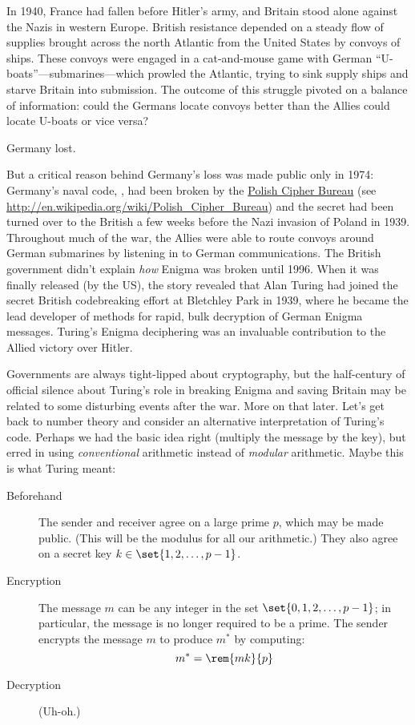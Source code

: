 In 1940, France had fallen before Hitler's army, and Britain stood alone
against the Nazis in western Europe.  British resistance depended on a
steady flow of supplies brought across the north Atlantic from the United
States by convoys of ships.  These convoys were engaged in a cat-and-mouse
game with German ``U-boats''---submarines---which prowled the Atlantic,
trying to sink supply ships and starve Britain into submission.  The
outcome of this struggle pivoted on a balance of information: could the
Germans locate convoys better than the Allies could locate U-boats or vice
versa?

Germany lost.

But a critical reason behind Germany's loss was made public only in
1974: Germany's naval code, , had been broken by
the \href{http://en.wikipedia.org/wiki/Polish_Cipher_Bureau}{Polish
Cipher Bureau}
(see \url{http://en.wikipedia.org/wiki/Polish\_Cipher\_Bureau}) and
the secret had been turned over to the British a few weeks before the
Nazi invasion of Poland in 1939.  Throughout much of the war, the
Allies were able to route convoys around German submarines by
listening in to German communications.  The British government didn't
explain \emph{how} Enigma was broken until 1996.  When it was finally
released (by the US), the story revealed that Alan Turing had joined
the secret British codebreaking effort at Bletchley Park in 1939,
where he became the lead developer of methods for rapid, bulk
decryption of German Enigma messages.  Turing's Enigma deciphering was
an invaluable contribution to the Allied victory over Hitler.

Governments are always tight-lipped about cryptography, but the
half-century of official silence about Turing's role in breaking
Enigma and saving Britain may be related to some disturbing events
after the war.  More on that later.  Let's get back to number theory
and consider an alternative interpretation of Turing's code.  Perhaps
we had the basic idea right (multiply the message by the key), but
erred in using \emph{conventional} arithmetic instead of
\emph{modular} arithmetic.  Maybe this is what Turing meant:
%
\begin{description}

\item[Beforehand] The sender and receiver agree on a large prime $p$,
which may be made public.  (This will be the modulus for all our
arithmetic.)  They also agree on a secret key $k \in \set{1, 2,
\dots, p-1}$.

\item[Encryption] The message $m$ can be any integer in the set
$\set{0, 1, 2, \dots, p-1}$; in particular, the message is no longer
required to be a prime.  The sender encrypts the message $m$ to
produce $m^*$ by computing:
%
\begin{equation}
m^* = \rem{mk}{p} \label{eq:turing-code}
\end{equation}

\item[Decryption] (Uh-oh.)

\end{description}

